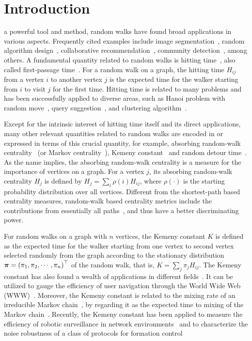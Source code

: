 \documentclass[journal]{IEEEtran}
\begin{document}
\section{Introduction}\label{sec:intro}

 a powerful tool and method, random walks have found broad applications in various aspects.
Frequently cited examples include image segmentation~\cite{Le06}, random algorithm design~\cite{SaDi12}, collaborative recommendation~\cite{FoPiReSa07}, community detection~\cite{LaDeBa14}, among others.
A fundamental quantity related to random walks is hitting time~\cite{Lo93}, also called first-passage time~\cite{CoBeTeVoKl07}.
For a random walk on a graph, the hitting time \(H_{ij}\) from a vertex \(i\) to another vertex \(j\) is the expected time for the walker starting from \(i\) to visit \(j\) for the first time.
Hitting time is related to many problems and has been successfully applied to diverse areas, such as Hanoi problem with random move~\cite{WuZhCh11}, query suggestion~\cite{MeZhCh08}, and clustering algorithm~\cite{ChLiTa08}.

Except for the intrinsic interest of hitting time itself and its direct applications, many other relevant quantities related to random walks are encoded in or expressed in terms of this crucial quantity, for example, absorbing random-walk centrality~\cite{MaMagi15} (or Markov centrality~\cite{WhSm03}), Kemeny constant~\cite{Hu14} and random detour time~\cite{RaZh13}.
As the name implies, the absorbing random-walk centrality is a measure for the importance of vertices on a graph.
For a vertex \(j\), its absorbing random-walk centrality \(H_j\) is defined by \(H_j=\sum_{i} \rho(i) H_{ij}\), where \(\rho(\cdot)\) is the starting probability distribution over all vertices.
Different from the shortest-path based centrality measures, random-walk based centrality metrics include the contributions from essentially all paths~\cite{Ne05}, and thus have a better discriminating power.

For random walks on a graph with \(n\) vertices, the Kemeny constant \(K\) is defined as the expected time for the walker starting from one vertex to second vertex selected randomly from the graph according to the stationary distribution \(\boldsymbol{\pi}=\left(\pi_1, \pi_2, \cdots, \pi_n\right)^{\top}\) of the random walk, that is, \(K=\sum_{j} \pi_j H_{ij}\).
The Kemeny constant has also found a wealth of applications in different fields~\cite{Hu14}.
It can be utilized to gauge the efficiency of user navigation through the World Wide Web (WWW)~\cite{LeLo02}.
Moreover, the Kemeny constant is related to the mixing rate of an irreducible Markov chain~\cite{LePeWi09}, by regarding it as the expected time to mixing of the Markov chain~\cite{Hu06}.
Recently, the Kemeny constant has been applied to measure the efficiency of robotic surveillance in network environments~\cite{PaAgBu15} and to characterize the noise robustness of a class of protocols for formation control~\cite{JaOl15}
\end{document}
